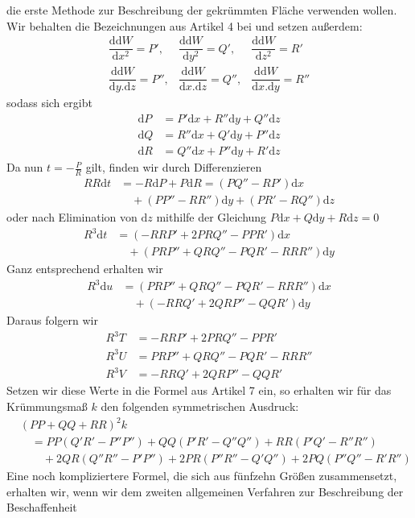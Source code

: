 %
die erste Methode zur Beschreibung der gekrümmten Fläche verwenden wollen. Wir behalten die Bezeichnungen aus Artikel 4 bei und setzen außerdem:
\[
\begin{array}{lll}
\dfrac{\mathrm{d}\mathrm{d}W}{\mathrm{d}x^2}=P',&\dfrac{\mathrm{d}\mathrm{d}W}{\mathrm{d}y^2}=Q',&\dfrac{\mathrm{d}\mathrm{d}W}{\mathrm{d}z^2}=R'\\[6pt]
\dfrac{\mathrm{d}\mathrm{d}W}{\mathrm{d}y\mathord{.}\mathrm{d}z}=P'',&\dfrac{\mathrm{d}\mathrm{d}W}{\mathrm{d}x\mathord{.}\mathrm{d}z}=Q'',&\dfrac{\mathrm{d}\mathrm{d}W}{\mathrm{d}x\mathord{.}\mathrm{d}y}=R''
\end{array}
\]
sodass sich ergibt
\[
\begin{aligned}
\mathrm{d}P&=P'\mathrm{d}x+R''\mathrm{d}y+Q''\mathrm{d}z\\
\mathrm{d}Q&=R''\mathrm{d}x+Q'\mathrm{d}y+P''\mathrm{d}z\\
\mathrm{d}R&=Q''\mathrm{d}x+P''\mathrm{d}y+R'\mathrm{d}z
\end{aligned}
\]
Da nun \(t=-\frac{P}{R}\) gilt, finden wir durch Differenzieren
\[
\begin{aligned}
RR\mathrm{d}t&=-R\mathrm{d}P+P\mathrm{d}R=(PQ''-RP')\mathrm{d}x\\
&\quad +(PP''-RR'')\mathrm{d}y+(PR'-RQ'')\mathrm{d}z
\end{aligned}
\]
oder nach Elimination von \(\mathrm{d}z\) mithilfe der Gleichung \(P\mathrm{d}x+Q\mathrm{d}y+R\mathrm{d}z=0\)
\[
\begin{aligned}
R^3\mathrm{d}t&=(-RRP'+2PRQ''-PPR')\mathrm{d}x\\
&\quad +(PRP''+QRQ''-PQR'-RRR'')\mathrm{d}y
\end{aligned}
\]
Ganz entsprechend erhalten wir
\[
\begin{aligned}
R^3\mathrm{d}u&=(PRP''+QRQ''-PQR'-RRR'')\mathrm{d}x\\
&\quad +(-RRQ'+2QRP''-QQR')\mathrm{d}y
\end{aligned}
\]
Daraus folgern wir
\[
\begin{aligned}
R^3T&=-RRP'+2PRQ''-PPR'\\
R^3U&=PRP''+QRQ''-PQR'-RRR''\\
R^3V&=-RRQ'+2QRP''-QQR'
\end{aligned}
\]
Setzen wir diese Werte in die Formel aus Artikel 7 ein, so erhalten wir für das Krümmungsmaß \(k\) den folgenden symmetrischen Ausdruck:
\[
\begin{aligned}
&(PP+QQ+RR)^2k\\
&\quad=PP(Q'R'-P''P'')+QQ(P'R'-Q''Q'')+RR(P'Q'-R''R'')\\
&\qquad+2QR(Q''R''-P'P'')+2PR(P''R''-Q'Q'')+2PQ(P''Q''-R'R'')
\end{aligned}
\]
Eine noch kompliziertere Formel, die sich aus fünfzehn Größen zusammensetzt, erhalten wir, wenn wir dem zweiten allgemeinen Verfahren zur Beschreibung der Beschaffenheit
